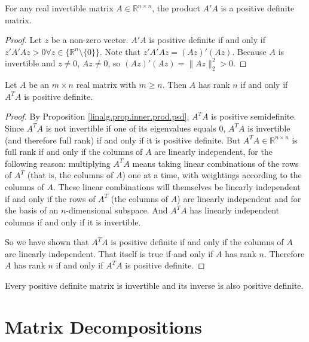 \begin{proposition}
For any real invertible matrix \(A \in \mathbb{R}^{n \times n}\), the product \(A' A\) is a positive definite matrix. 

\end{proposition}

\begin{proof} Let \(z\) be a non-zero vector. \(A'A\) is positive definite if and only if \(z' A' A z >0 \forall z \in \{\mathbb{R}^n \setminus \{0\}\}\). Note that \(z' A' A z = (Az)'(Az)\). Because \(A\) is invertible and \(z \neq 0\), \(Az \neq 0 \), so \((Az)'(Az) = \lVert Az \rVert_2^2 > 0\).
\end{proof}



\begin{proposition}
Let $A$ be an $m\times n$ real matrix with $m\geq n$. Then $A$ has rank $n$ if and only if $A^{T}A$ is positive definite.
\end{proposition}

\begin{proof}


By Proposition \ref{linalg.prop.inner.prod.psd}, \(A^TA\) is positive semidefinite. Since \(A^TA\) is not invertible if one of its eigenvalues equals 0, \(A^TA\) is invertible (and therefore full rank) if and only if it is positive definite. But \(A^TA \in \mathbb{R}^{n \times n}\) is full rank if and only if the columns of \(A\) are linearly independent, for the following reason: multiplying \(A^TA\) means taking linear combinations of the rows of \(A^T\) (that is, the columns of \(A\)) one at a time, with weightings according to the columns of \(A\). These linear combinations will themselves be linearly independent if and only if the rows of \(A^T\) (the columns of \(A\)) are linearly independent and for the basis of an \(n\)-dimensional subspace. And \(A^TA\) has linearly independent columns if and only if it is invertible.

So we have shown that \(A^TA\) is positive definite if and only if the columns of \(A\) are linearly independent. That itself is true if and only if \(A\) has rank \(n\). Therefore \(A\) has rank \(n\) if and only if \(A^TA\) is positive definite.

\end{proof}


Every positive definite matrix is invertible and its inverse is also positive definite.

\section{Matrix Decompositions}\label{linalg.mat.decomp}

